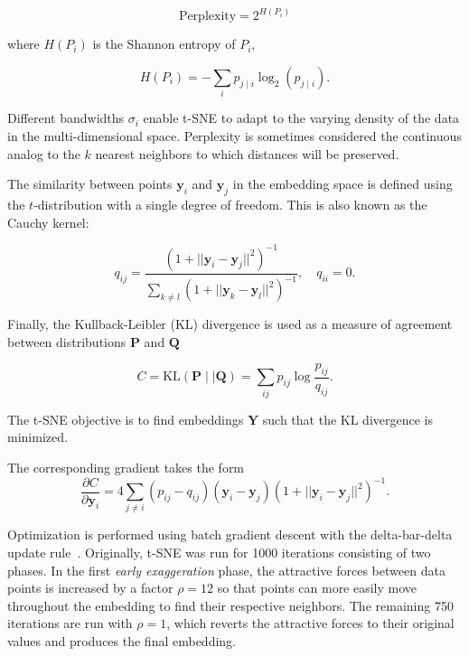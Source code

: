\documentclass[twocolumn]{bmcart}
\begin{document}
\begin{equation}
\text{Perplexity} = 2^{H(P_i)}
\end{equation}

\noindent where $H(P_i)$ is the Shannon entropy of $P_i$,

\begin{equation}
H(P_i) = -\sum_i p_{j \mid i} \log_2 (p_{j \mid i}).
\end{equation}

\noindent Different bandwidths $\sigma_i$ enable t-SNE to adapt to the varying
density of the data in the multi-dimensional space. Perplexity is sometimes considered the continuous analog to the $k$ nearest neighbors to which distances will be preserved. 

The similarity between points $\mathbf{y}_i$ and $\mathbf{y}_j$ in the
embedding space is defined using the $t$-distribution with a single degree of
freedom. This is also known as the Cauchy kernel:

\begin{equation}
q_{ij} = \frac{\left ( 1 + || \mathbf{y}_i - \mathbf{y}_j ||^2 \right )^{-1}}
{\sum_{k \neq l}\left ( 1 + || \mathbf{y}_k - \mathbf{y}_l ||^2 \right )^{-1}},
\quad q_{ii} = 0.
\label{eq:cauchy_kernel}
\end{equation}

Finally, the Kullback-Leibler (KL) divergence is used as a measure of agreement between distributions $\mathbf{P}$ and $\mathbf{Q}$

\begin{equation}
C = \text{KL}(\mathbf{P} \mid \mid \mathbf{Q}) = \sum_{ij} p_{ij} \log \frac{p_{ij}}{q_{ij}}.
\label{eq:kl_divergence}
\end{equation}

\noindent The t-SNE objective is to find embeddings $\mathbf{Y}$ such that the KL divergence is minimized.

The corresponding gradient takes the form
\begin{equation}
\frac{\partial C}{\partial \mathbf{y}_i} = 4 \sum_{j \neq i} \left ( p_{ij} - q_{ij} \right ) \left ( \mathbf{y}_i - \mathbf{y}_j \right ) \left ( 1 + || \mathbf{y}_i - \mathbf{y}_j || ^2 \right )^{-1}.
\label{eq:tsne_gradient}
\end{equation}

Optimization is performed using batch gradient descent with the delta-bar-delta update rule~\cite{jacobs1988increased}. Originally, t-SNE was run for 1000 iterations consisting of two phases. In the first \textit{early exaggeration} phase, the attractive forces between data points is increased by a factor $\rho=12$ so that points can more easily move throughout the embedding to find their respective neighbors. The remaining 750 iterations are run with $\rho=1$, which reverts the attractive forces to their original values and produces the final embedding.
\end{document}
